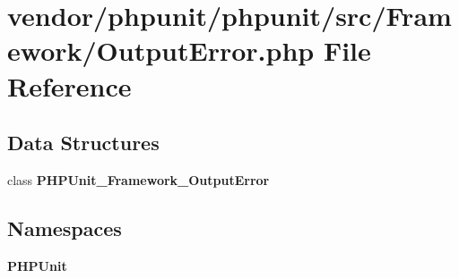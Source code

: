 \section{vendor/phpunit/phpunit/src/\+Framework/\+Output\+Error.php File Reference}
\label{_output_error_8php}
\subsection*{Data Structures}
\begin{DoxyCompactItemize}
\item 
class {\bf P\+H\+P\+Unit\+\_\+\+Framework\+\_\+\+Output\+Error}
\end{DoxyCompactItemize}
\subsection*{Namespaces}
\begin{DoxyCompactItemize}
\item 
 {\bf P\+H\+P\+Unit}
\end{DoxyCompactItemize}
